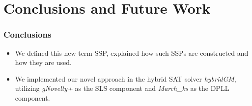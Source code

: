 \documentclass[aspectratio=169%
,serif,mathserif]{beamer}
\begin{document}




\section{Conclusions and Future Work}

\begin{frame}
	\frametitle{Conclusions}
	\begin{itemize}
		\item We defined this new term SSP, explained how such SSPs are constructed and how they are used.
		\item We implemented our novel approach in the hybrid SAT solver \emph{hybridGM}, utilizing \emph{gNovelty+} as the SLS component and \emph{March\_ks} as the DPLL component.
	\end{itemize}
\end{frame}
\end{document}
